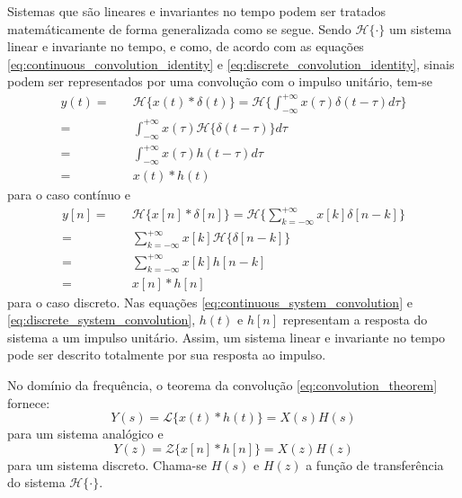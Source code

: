 \documentclass[12pt,a4paper]{report}
\begin{document}
  Sistemas que são lineares e invariantes no tempo podem ser tratados matemáticamente de forma generalizada como
  se segue. Sendo $\mathcal{H}\{\cdot\}$ um sistema linear e invariante no tempo, e como, de acordo com as
  equações \ref{eq:continuous_convolution_identity} e \ref{eq:discrete_convolution_identity}, sinais podem ser
  representados por uma convolução com o impulso unitário, tem-se
  \begin{equation}
    \label{eq:continuous_system_convolution}
    \begin{split}
      y(t) = &\quad \mathcal{H}\{x(t) \ast \delta(t)\}
      = \mathcal{H}\{\int_{-\infty}^{+\infty} x(\tau) \delta(t - \tau) d\tau\}
      \\ = &\quad \int_{-\infty}^{+\infty} x(\tau) \mathcal{H}\{\delta(t - \tau)\} d\tau
      \\ = &\quad \int_{-\infty}^{+\infty} x(\tau) h(t - \tau) d\tau
      \\ = &\quad x(t) \ast h(t)
    \end{split}
  \end{equation}
  para o caso contínuo e
  \begin{equation}
    \label{eq:discrete_system_convolution}
    \begin{split}
      y[n] = &\quad \mathcal{H}\{x[n] \ast \delta[n]\}
      = \mathcal{H}\{\sum_{k = -\infty}^{+\infty} x[k] \delta[n - k]\}
      \\ = &\quad \sum_{k = -\infty}^{+\infty} x[k] \mathcal{H}\{\delta[n - k]\}
      \\ = &\quad \sum_{k = -\infty}^{+\infty} x[k] h[n - k]
      \\ = &\quad x[n] \ast h[n]
  \end{split}
  \end{equation}
  para o caso discreto. Nas equações \ref{eq:continuous_system_convolution} e
  \ref{eq:discrete_system_convolution}, $h(t)$ e $h[n]$ representam a resposta do sistema a um impulso unitário.
  Assim, um sistema linear e invariante no tempo pode ser descrito totalmente por sua resposta ao impulso.

  No domínio da frequência, o teorema da convolução \ref{eq:convolution_theorem} fornece:
  \begin{equation}
    Y(s) = \mathcal{L}\{x(t) \ast h(t)\} = X(s) H(s)
  \end{equation}
  para um sistema analógico e
  \begin{equation}
    Y(z) = \mathcal{Z}\{x[n] \ast h[n]\} = X(z) H(z)
  \end{equation}
  para um sistema discreto. Chama-se $H(s)$ e $H(z)$ a função de transferência do sistema $\mathcal{H\{\cdot}\}$.
\end{document}
